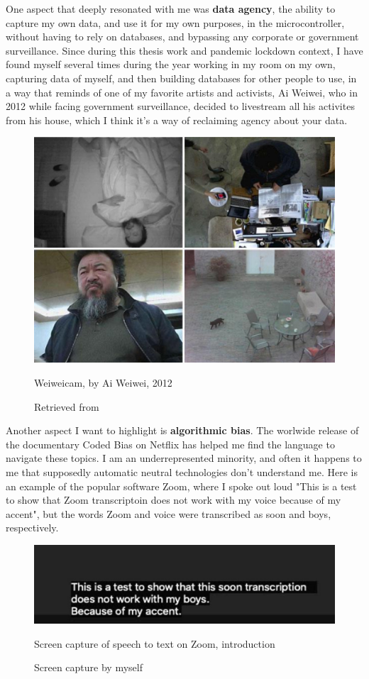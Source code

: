 One aspect that deeply resonated with me was \textbf{data agency}, the ability to capture my own data, and use it for my own purposes, in the microcontroller, without having to rely on databases, and bypassing any corporate or government surveillance. Since during this thesis work and pandemic lockdown context, I have found myself several times during the year working in my room on my own, capturing data of myself, and then building databases for other people to use, in a way that reminds of one of my favorite artists and activists, Ai Weiwei, who in 2012 while facing government surveillance, decided to livestream all his activites from his house, which I think it's a way of reclaiming agency about your data. 

\begin{figure}[ht]
  \centering
  \includegraphics[width=0.75\linewidth,height=0.25\textheight,keepaspectratio]{images/weiweicam.jpg}
  \caption{Weiweicam, by Ai Weiwei, 2012}
  \caption*{Retrieved from \cite{website-forbes-ai-weiwei-cam}}
  \label{fig:weiweicam}
\end{figure}

Another aspect I want to highlight is \textbf{algorithmic bias}. The worlwide release of the documentary Coded Bias on Netflix has helped me find the language to navigate these topics. I am an underrepresented minority, and often it happens to me that supposedly automatic neutral technologies don't understand me. Here is an example of the popular software Zoom, where I spoke out loud "This is a test to show that Zoom transcriptoin does not work with my voice because of my accent", but the words Zoom and voice were transcribed as soon and boys, respectively.

\begin{figure}[ht]
  \centering
  \includegraphics[width=0.75\linewidth,height=0.25\textheight,keepaspectratio]{images/zoom-introduction.jpg}
  \caption{Screen capture of speech to text on Zoom, introduction}
  \caption*{Screen capture by myself}
  \label{fig:zoom-voice}
\end{figure}

